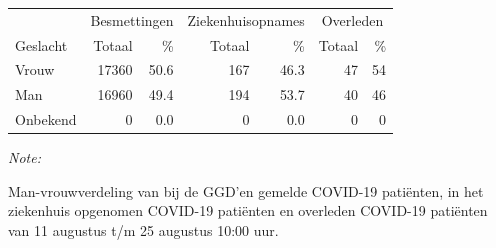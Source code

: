 \documentclass[
  english,
  man,floatsintext]{apa6}
\begin{document}
\begin{table}
\centering\begingroup\fontsize{11}{13}\selectfont

\begin{threeparttable}
\begin{tabular}{lrrrrrr}
\toprule
\multicolumn{1}{c}{ } & \multicolumn{2}{c}{Besmettingen} & \multicolumn{2}{c}{Ziekenhuisopnames} & \multicolumn{2}{c}{Overleden} \\
\cmidrule(l{3pt}r{3pt}){2-3} \cmidrule(l{3pt}r{3pt}){4-5} \cmidrule(l{3pt}r{3pt}){6-7}
Geslacht & Totaal & \% & Totaal & \% & Totaal & \%\\
\midrule
Vrouw & 17360 & 50.6 & 167 & 46.3 & 47 & 54\\
Man & 16960 & 49.4 & 194 & 53.7 & 40 & 46\\
Onbekend & 0 & 0.0 & 0 & 0.0 & 0 & 0\\
\bottomrule
\end{tabular}
\begin{tablenotes}
\item \textit{Note: } 
\item Man-vrouwverdeling van bij de GGD’en gemelde COVID-19 patiënten, in het ziekenhuis opgenomen COVID-19 patiënten en overleden COVID-19 patiënten van 11 augustus t/m 25 augustus 10:00 uur.
\end{tablenotes}
\end{threeparttable}
\endgroup{}
\end{table}
\newpage
\end{document}
